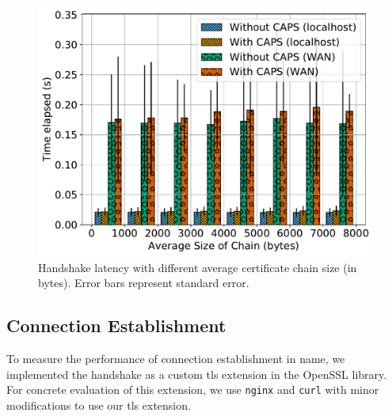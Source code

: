 \begin{figure}[t]
  \centering
  \includegraphics[width=\linewidth]{fig/eval_tls_ext/3-time_elapsed_vs_avg_chain_size}
  \caption{Handshake latency with different average certificate chain size (in
  bytes). Error bars represent standard error.}
  \label{fig:evaltlsext:sizechain}
\end{figure}

\subsection{Connection Establishment}
\label{sec:evaluation:performance}

To measure the performance of connection establishment in \ac{name}, we
implemented the handshake as a custom \ac{tls} extension in the OpenSSL library.
For concrete evaluation of this extension, we use \texttt{nginx} and \texttt{curl} with minor
modifications to use our \ac{tls} extension.

